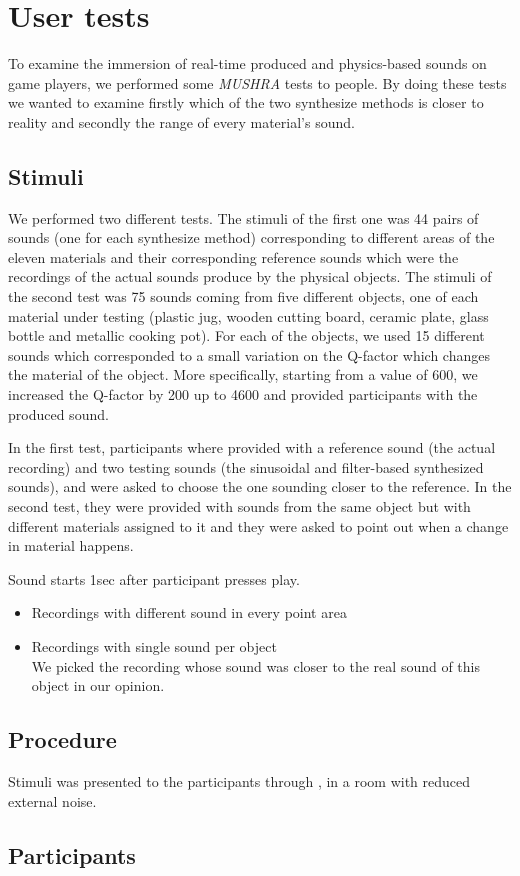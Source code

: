 \section{User tests}

To examine the immersion of real-time produced and physics-based sounds on game players, we performed some \textit{MUSHRA} tests to people. By doing these tests we wanted to examine firstly which of the two synthesize methods is closer to reality and secondly the range of every material's sound.

\subsection{Stimuli}
We performed two different tests. The stimuli of the first one was 44 pairs of sounds (one for each synthesize method) corresponding to different areas of the eleven materials and their corresponding reference sounds which were the recordings of the actual sounds produce by the physical objects. The stimuli of the second test was 75 sounds coming from five different objects, one of each material under testing (plastic jug, wooden cutting board, ceramic plate, glass bottle and metallic cooking pot). For each of the objects, we used 15 different sounds which corresponded to a small variation on the Q-factor which changes the material of the object. More specifically, starting from a value of 600, we increased the Q-factor by 200 up to 4600  and provided participants with the produced sound.

In the first test, participants where provided with a reference sound (the actual recording) and two testing sounds (the sinusoidal and filter-based synthesized sounds), and were asked to choose the one sounding closer to the reference. In the second test, they were provided with sounds from the same object but with different materials assigned to it and they were asked to point out when a change in material happens. 

Sound starts 1sec after participant presses play.
\begin{itemize}
\item Recordings with different sound in every point area
\item Recordings with single sound per object\\
We picked the recording whose sound was closer to the real sound of this object in our opinion.\\

\end{itemize}

\subsection{Procedure}
Stimuli was presented to the participants through , in a room with reduced external noise.

\subsection{Participants}
